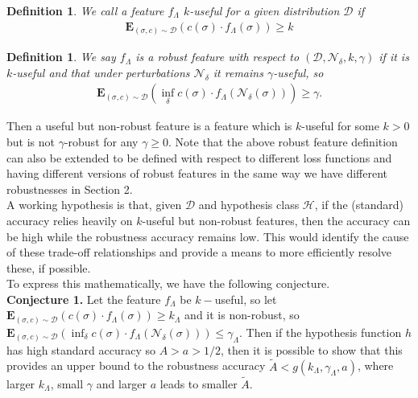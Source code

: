 \documentclass[onecolumn,prx, superscriptaddress,longbibliography,margin=1mm 11pt]{revtex4-2}
\newtheorem{definition}[theorem]{Definition}
\begin{document}
    
    \begin{definition} We call a feature $f_{\Lambda}$ \textit{$k$-useful} for a given distribution $\mathcal{D}$ if 
    \begin{align}
        \textbf{E}_{(\sigma, c)\sim  \mathcal{D}}(c(\sigma) \cdot f_{\Lambda}(\sigma))\geq k
    \end{align}
    \end{definition}
    
    \begin{definition} 
    We say $f_{\Lambda}$ is a \textit{robust feature} with respect to $(\mathcal{D}, \mathcal{N}_{\delta}, k, \gamma)$ if it is $k$-useful and that under perturbations $\mathcal{N}_{\delta}$ it remains $\gamma$-useful, so
    \begin{align}
        \textbf{E}_{(\sigma, c)\sim  \mathcal{D}}(\inf_{\delta} c(\sigma) \cdot f_{\Lambda}(\mathcal{N}_{\delta}(\sigma)))\geq \gamma. 
    \end{align}
    \end{definition}
    Then a useful but non-robust feature is a feature which is $k$-useful for some $k>0$ but is not $\gamma$-robust for any $\gamma \geq 0$. Note that the above robust feature definition can also be extended to be defined with respect to different loss functions and having different versions of robust features in the same way we have different robustnesses in Section 2.\\
    
    A working hypothesis is that, given  $\mathcal{D}$ and hypothesis class $\mathcal{H}$, if the (standard) accuracy relies heavily on $k$-useful but non-robust features, then the accuracy can be high while the robustness accuracy remains low. This would identify the cause of these trade-off relationships and provide a means to more efficiently resolve these, if possible. \\
    
    To express this mathematically, we have the following conjecture.\\
    
    \noindent \textbf{Conjecture 1.} Let the feature $f_{\Lambda}$ be $k-$useful, so  let $\textbf{E}_{(\sigma, c)\sim  \mathcal{D}}(c(\sigma) \cdot f_{\Lambda}(\sigma))\geq k_{\Lambda}$ and it is non-robust, so $\textbf{E}_{(\sigma, c)\sim  \mathcal{D}}(\inf_{\delta} c(\sigma) \cdot f_{\Lambda}(\mathcal{N}_{\delta}(\sigma)))\leq \gamma_{\Lambda}$. Then if the hypothesis function $h$ has high standard accuracy so $A>a>1/2$, then it is possible to show that this provides an upper bound to the robustness accuracy $\tilde{A}<g(k_{\Lambda}, \gamma_{\Lambda}, a)$, where larger $k_{\Lambda}$, small $\gamma$ and larger $a$ leads to smaller $\tilde{A}$.\\
    
\end{document}

